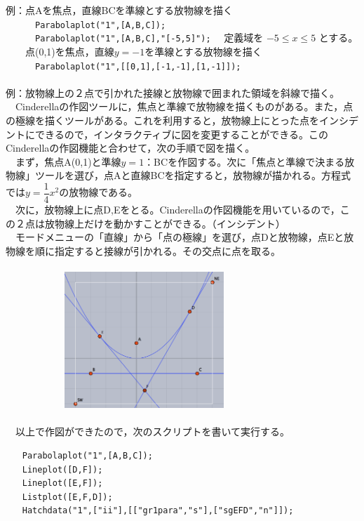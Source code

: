\documentclass[papersize,a4paper,12pt,uplatex]{jsarticle}
\begin{document}
\begin{description}
例：点Aを焦点，直線BCを準線とする放物線を描く\\
　　　\verb|Parabolaplot("1",[A,B,C]); |\\
　　　\verb|Parabolaplot("1",[A,B,C],"[-5,5]");| 　定義域を $-5 \leq x \leq 5$ とする。\\
　　点(0,1)を焦点，直線$y=-1$を準線とする放物線を描く\\
　　　\verb|Parabolaplot("1",[[0,1],[-1,-1],[1,-1]]);|\\
　\\
例：放物線上の２点で引かれた接線と放物線で囲まれた領域を斜線で描く。\\
　Cinderellaの作図ツールに，焦点と準線で放物線を描くものがある。また，点の極線を描くツールがある。これを利用すると，放物線上にとった点をインシデントにできるので，インタラクティブに図を変更することができる。このCinderellaの作図機能と合わせて，次の手順で図を描く。\\
　まず，焦点A(0,1)と準線$y=1$：BCを作図する。次に「焦点と準線で決まる放物線」ツールを選び，点Aと直線BCを指定すると，放物線が描かれる。方程式では$y=\dfrac{1}{4}x^2$の放物線である。\\
　次に，放物線上に点D,Eをとる。Cinderellaの作図機能を用いているので，この２点は放物線上だけを動かすことができる。（インシデント）\\
　モードメニューの「直線」から「点の極線」を選び，点Dと放物線，点Eと放物線を順に指定すると接線が引かれる。その交点に点を取る。\\
　\\
　　　　　　\includegraphics[bb=0 0 964 826 , width=6cm]{Fig/parabolaplot.png}\\
　\\
　以上で作図ができたので，次のスクリプトを書いて実行する。
\begin{verbatim}
　　Parabolaplot("1",[A,B,C]); 
　　Lineplot([D,F]);
　　Lineplot([E,F]);
　　Listplot([E,F,D]);
　　Hatchdata("1",["ii"],[["gr1para","s"],["sgEFD","n"]]);
\end{verbatim}
　\\

\end{description}
\end{document}
